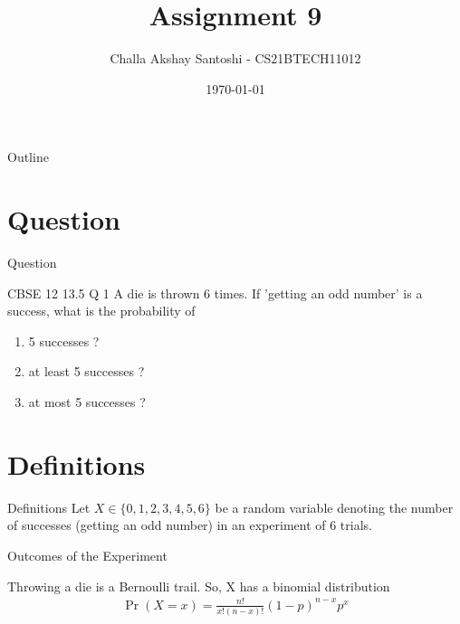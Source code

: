 \documentclass{beamer}
\title{Assignment 9}
\author{Challa Akshay Santoshi - CS21BTECH11012}
\date{\today}
\providecommand{\pr}[1]{\ensuremath{\Pr\left(#1\right)}}
\providecommand{\pr}[1]{\ensuremath{\Pr\left(#1\right)}}
\providecommand{\brak}[1]{\ensuremath{\left(#1\right)}}
\begin{document}
\begin{frame}
    \titlepage 
\end{frame}

\logo{}


\begin{frame}{Outline}
    \tableofcontents
\end{frame}


\section{Question}
\begin{frame}{Question}
\begin{block}{CBSE 12 13.5 Q 1} A die is thrown 6 times. If 'getting an odd number' is a success, what is the probability of
\begin{enumerate}
    \item 5 successes ?
    \item at least 5 successes ?
    \item at most 5 successes ?
\end{enumerate}
    \end{block}
\end{frame}



\section{Definitions}
\begin{frame}{Definitions}
Let $X \in \{0,1,2,3,4,5,6\} $ be a random variable denoting the number of successes (getting an odd number) in an experiment of 6 trials.\\
 \begin{table}[ht!]
    \centering
    
    \caption{Outcomes of the Experiment}
	\label{table:table1}
\end{table}   
Throwing a die is a Bernoulli trail. So, X has a binomial distribution
\begin{align}
   \pr{X=x} = \frac{n!}{x! (n-x)!}\brak{1-p}^{n-x}p^{x}
\end{align}
\end{frame}
\end{document}
